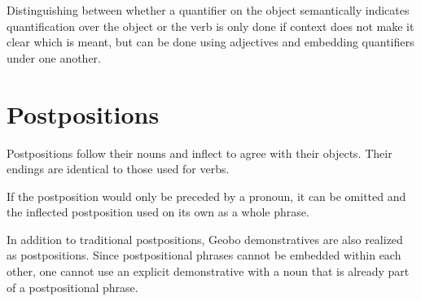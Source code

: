 \documentclass[a4paper,11pt,oneside,openany]{memoir}
\begin{document}
Distinguishing between whether a quantifier on the object semantically indicates quantification over the object or the verb is only done if context does not make it clear which is meant, but can be done using adjectives and embedding quantifiers under one another.


\section{Postpositions}

Postpositions follow their nouns and inflect to agree with their objects. Their endings are identical to those used for verbs.


If the postposition would only be preceded by a pronoun, it can be omitted and the inflected postposition used on its own as a whole phrase.


In addition to traditional postpositions, Geobo{\engma} demonstratives are also realized as postpositions. Since postpositional phrases cannot be embedded within each other, one cannot use an explicit demonstrative with a noun that is already part of a postpositional phrase.

\end{document}
